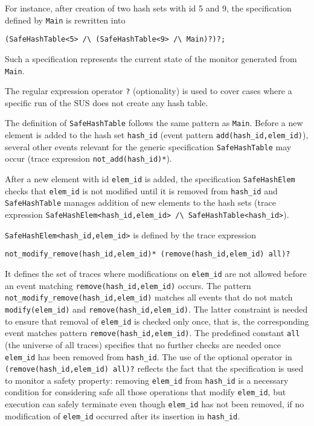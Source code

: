 For instance, after creation of two hash sets with id 5 and 9, the specification defined by \lstinline{Main} is rewritten into
\begin{lstlisting}[basicstyle=\ttfamily\scriptsize]
(SafeHashTable<5> /\ (SafeHashTable<9> /\ Main)?)?;
\end{lstlisting}
Such a specification represents the current state of the monitor generated from \lstinline{Main}.

The regular expression operator \lstinline{?} (optionality)
is used to cover cases where a specific run of the SUS does not create any hash table.

The definition of \lstinline{SafeHashTable} follows the same pattern as \lstinline{Main}.
Before a new element is added to the hash set \lstinline{hash_id} (event pattern \lstinline{add(hash_id,elem_id)}), several other events relevant for the generic specification \lstinline{SafeHashTable} may occur (trace expression \lstinline{not_add(hash_id)*}).

After a new element with id \lstinline{elem_id} is added, the specification \lstinline{SafeHashElem} checks that \lstinline{elem_id} is not modified
until it is removed from \lstinline{hash_id} and \lstinline{SafeHashTable} manages addition of new elements to the hash sets
(trace expression \lstinline{SafeHashElem<hash_id,elem_id> /\ SafeHashTable<hash_id>}).

\lstinline{SafeHashElem<hash_id,elem_id>} is defined by the trace expression
\begin{lstlisting}
not_modify_remove(hash_id,elem_id)* (remove(hash_id,elem_id) all)?
\end{lstlisting}

It defines the set of traces where modifications on \lstinline{elem_id} are not allowed before an event matching \lstinline{remove(hash_id,elem_id)}
occurs. The pattern \lstinline{not_modify_remove(hash_id,elem_id)} matches all events that do not match \lstinline{modify(elem_id)} and \lstinline{remove(hash_id,elem_id)}. The latter constraint is needed to ensure that removal of \lstinline{elem_id} is checked only once, that is, the corresponding event matches pattern \lstinline{remove(hash_id,elem_id)}. 
The predefined constant \lstinline{all} (the universe of all traces) specifies that no further checks are needed once \lstinline{elem_id} has been removed from \lstinline{hash_id}. The use of the optional operator in \lstinline{(remove(hash_id,elem_id) all)?} reflects the fact that the specification
is used to monitor a safety property: removing \lstinline{elem_id} from \lstinline{hash_id} is a necessary condition for considering safe
all those operations that modify \lstinline{elem_id}, but execution can safely terminate even though \lstinline{elem_id} has not been removed,
if no modification of \lstinline{elem_id} occurred after its insertion in \lstinline{hash_id}.

